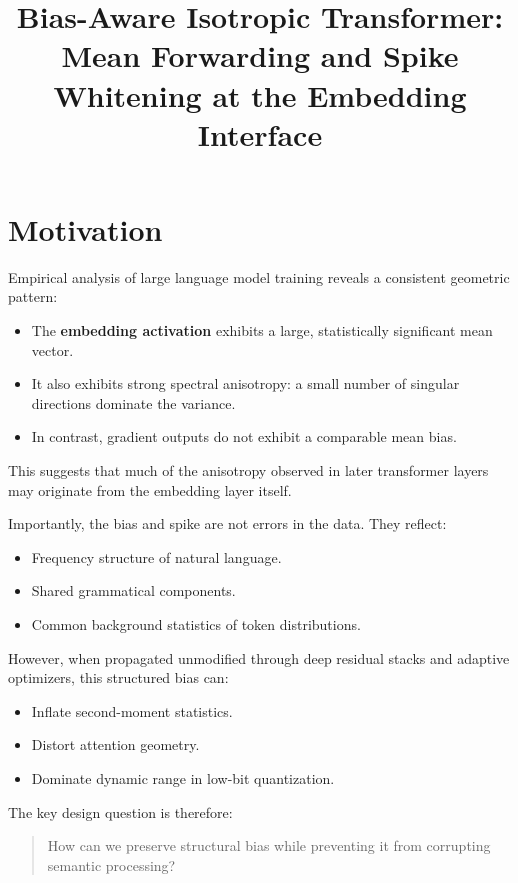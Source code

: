 \documentclass[11pt]{article}
\title{Bias-Aware Isotropic Transformer:\\
Mean Forwarding and Spike Whitening at the Embedding Interface}
\author{}
\date{}
\begin{document}
\maketitle

\section{Motivation}

Empirical analysis of large language model training reveals a consistent geometric pattern:

\begin{itemize}
    \item The \textbf{embedding activation} exhibits a large, statistically significant mean vector.
    \item It also exhibits strong spectral anisotropy: a small number of singular directions dominate the variance.
    \item In contrast, gradient outputs do not exhibit a comparable mean bias.
\end{itemize}

This suggests that much of the anisotropy observed in later transformer layers may originate from the embedding layer itself.

Importantly, the bias and spike are not errors in the data. They reflect:

\begin{itemize}
    \item Frequency structure of natural language.
    \item Shared grammatical components.
    \item Common background statistics of token distributions.
\end{itemize}

However, when propagated unmodified through deep residual stacks and adaptive optimizers, this structured bias can:

\begin{itemize}
    \item Inflate second-moment statistics.
    \item Distort attention geometry.
    \item Dominate dynamic range in low-bit quantization.
\end{itemize}

The key design question is therefore:

\begin{quote}
How can we preserve structural bias while preventing it from corrupting semantic processing?
\end{quote}
\end{document}
